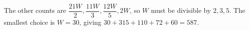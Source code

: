 The other counts are $\dfrac{21W}{2},\dfrac{11W}{3},\dfrac{12W}{5},2W$, so $W$ must be divisible by $2,3,5$. The smallest choice is $W=30$, giving $30+315+110+72+60=\boxed{587}$.
